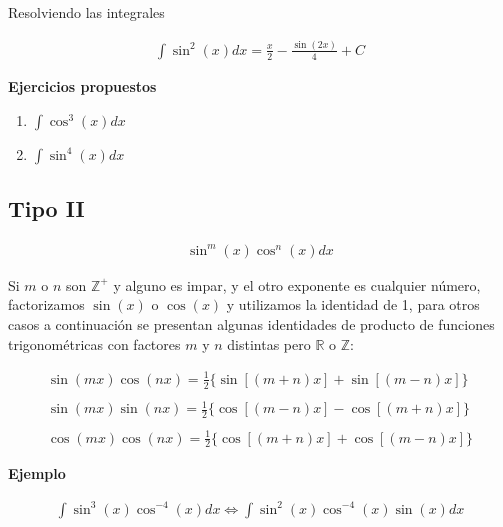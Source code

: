 Resolviendo las integrales

\begin{equation*}
    \begin{gathered}
        \int\sin^{2}(x)dx=\frac{x}{2}-\frac{\sin(2x)}{4}+C
    \end{gathered}
\end{equation*}

\textbf{Ejercicios propuestos}

\begin{enumerate}
  \item \(\displaystyle\int\cos^{3}(x)dx\)
  \item \(\displaystyle\int\sin^{4}(x)dx\)
\end{enumerate}


\subsection{Tipo II}

\begin{equation*}
    \begin{gathered}
        \sin^{m}(x)\cos^{n}(x)dx
    \end{gathered}
\end{equation*}

Si \(\displaystyle m\) o \(\displaystyle n\) son \(\displaystyle\mathbb{Z^{+}}\) y alguno es impar, y el otro exponente es cualquier número, factorizamos \(\displaystyle\sin(x)\) o \(\displaystyle\cos(x)\) y utilizamos la identidad de 1, para otros casos a continuación se presentan algunas identidades de producto de funciones trigonométricas con factores \(\displaystyle m\) y \(\displaystyle n\) distintas pero \(\displaystyle\mathbb{R}\) o \(\displaystyle\mathbb{Z}\):

\begin{equation*}
    \begin{gathered}
        \sin(mx)\cos(nx)=\frac{1}{2}\{\sin[(m+n)x]+\sin[(m-n)x]\}\\\\
        \sin(mx)\sin(nx)=\frac{1}{2}\{\cos[(m-n)x]-\cos[(m+n)x]\}\\\\
        \cos(mx)\cos(nx)=\frac{1}{2}\{\cos[(m+n)x]+\cos[(m-n)x]\}
    \end{gathered}
\end{equation*}

\textbf{Ejemplo}

\begin{equation}
    \begin{gathered}
        \int\sin^{3}(x)\cos^{-4}(x)dx \Leftrightarrow \int\sin^{2}(x)\cos^{-4}(x)\sin(x)dx
    \end{gathered}
\end{equation}

